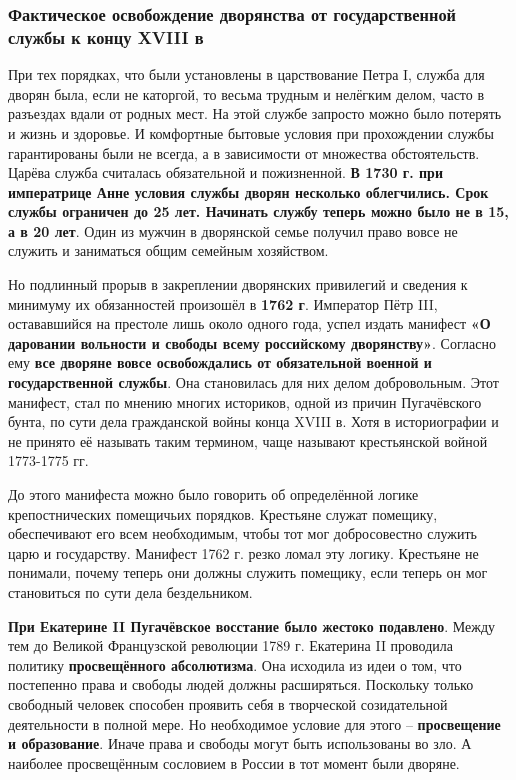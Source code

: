 \documentclass{article}
\begin{document}
\subsubsection{Фактическое освобождение дворянства от государственной службы к концу XVIII в}

При тех порядках, что были установлены в царствование Петра I, служба для дворян была, если не каторгой, то весьма трудным и нелёгким делом, часто в разъездах вдали от родных мест. На этой службе запросто можно было потерять и жизнь и здоровье. И комфортные бытовые условия при прохождении службы гарантированы были не всегда, а в зависимости от множества обстоятельств. Царёва служба считалась обязательной и пожизненной. \textbf{В 1730 г. при императрице Анне условия службы дворян несколько облегчились. Срок службы ограничен до 25 лет. Начинать службу теперь можно было не в 15, а в 20 лет}. Один из мужчин в дворянской семье получил право вовсе не служить и заниматься общим семейным хозяйством.

\hfill

Но подлинный прорыв в закреплении дворянских привилегий и сведения к минимуму их обязанностей произошёл в \textbf{1762 г}. Император Пётр III, остававшийся на престоле лишь около одного года, успел издать манифест \textbf{«О даровании вольности и свободы всему российскому дворянству»}. Согласно ему \textbf{все дворяне вовсе освобождались от обязательной военной и государственной службы}. Она становилась для них делом добровольным. Этот манифест, стал по мнению многих историков, одной из причин Пугачёвского бунта, по сути дела гражданской войны конца XVIII в. Хотя в историографии и не принято её называть таким термином, чаще называют крестьянской войной 1773-1775 гг.

\hfill

До этого манифеста можно было говорить об определённой логике крепостнических помещичьих порядков. Крестьяне служат помещику, обеспечивают его всем необходимым, чтобы тот мог добросовестно служить царю и государству. Манифест 1762 г. резко ломал эту логику. Крестьяне не понимали, почему теперь они должны служить помещику, если теперь он мог становиться по сути дела бездельником.

\hfill

\textbf{При Екатерине II Пугачёвское восстание было жестоко подавлено}. Между тем до Великой Французской революции 1789 г. Екатерина II проводила политику \textbf{просвещённого абсолютизма}. Она исходила из идеи о том, что постепенно права и свободы людей должны расширяться. Поскольку только свободный человек способен проявить себя в творческой созидательной деятельности в полной мере. Но необходимое условие для этого – \textbf{просвещение и образование}. Иначе права и свободы могут быть использованы во зло. А наиболее просвещённым сословием в России в тот момент были дворяне.
\end{document}
